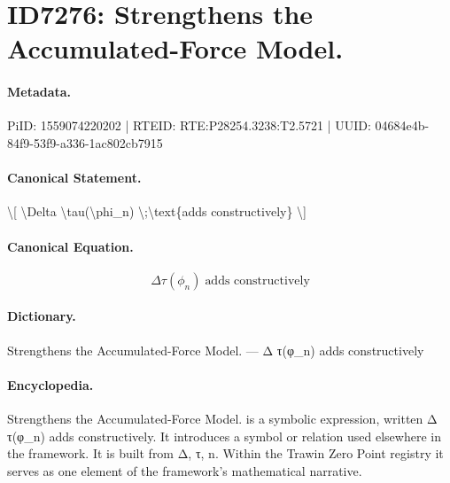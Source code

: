\section*{ID7276: Strengthens the Accumulated-Force Model.}
\paragraph{Metadata.}
PiID: 1559074220202 | RTEID: RTE:P28254.3238:T2.5721 | UUID: 04684e4b-84f9-53f9-a336-1ac802cb7915

\paragraph{Canonical Statement.}
\textbackslash{}[ \textbackslash{}Delta \textbackslash{}tau(\textbackslash{}phi\_n) \textbackslash{};\textbackslash{}text\{adds constructively\} \textbackslash{}]

\paragraph{Canonical Equation.}
\[
\Delta \tau(\phi_n) \;\text{adds constructively}
\]

\paragraph{Dictionary.}
Strengthens the Accumulated-Force Model. — Δ τ(φ\_n) adds constructively

\paragraph{Encyclopedia.}
Strengthens the Accumulated-Force Model. is a symbolic expression, written Δ τ(φ\_n) adds constructively. It introduces a symbol or relation used elsewhere in the framework. It is built from Δ, τ, n. Within the Trawin Zero Point registry it serves as one element of the framework's mathematical narrative.
